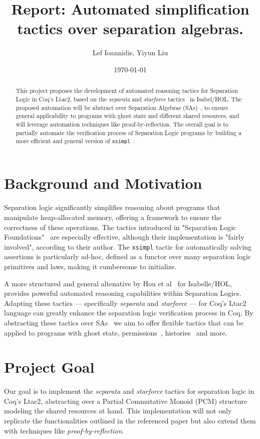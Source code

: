 \documentclass[12pt,lettersize]{article}
\title{Report: Automated simplification tactics over separation algebras.}
\author{Lef Ioannidis, Yiyun Liu}
\date{\today}
\begin{document}
\maketitle


\begin{abstract}
This project proposes the development of automated reasoning tactics for Separation Logic in Coq's Ltac2, based on the \emph{separata}
and \emph{starforce} tactics~\cite{hou2017proof} in Isabel/HOL. The proposed automation will be
abstract over Separation Algebras (SAs)~\cite{calcagno2007local}, to ensure general applicability to programs with 
ghost state and different shared resources, and will leverage automation techniques like proof-by-reflection.
The overall goal is to partially automate the verification process of Separation Logic programs by building
a more efficient and general version of \texttt{xsimpl}~\cite{chargueraud2020separation}.
\end{abstract}

\section{Background and Motivation}
Separation logic significantly simplifies reasoning about programs that manipulate heap-allocated memory, offering a framework
to ensure the correctness of these operations. The tactics introduced in "Separation Logic Foundations"~\cite{chargueraud2020separation}
are especially effective, although their implementation is "fairly involved", according to their author. The \texttt{xsimpl} tactic
for automatically solving assertions is particularly ad-hoc, defined as a functor over many separation logic primitives and laws,
making it cumbersome to initialize.

A more structured and general altenative by Hou et al~\cite{hou2017proof} for Isabelle/HOL, provides powerful automated reasoning
capabilities within Separation Logics. Adapting these tactics --- specifically \emph{separata} and 
\emph{starforce} --- for Coq's Ltac2 language can greatly enhance the separation logic verification process in Coq.
By abstracting these tactics over SAs~\cite{calcagno2007local} we aim to offer
flexible tactics that can be applied to programs with ghost state, permissions~\cite{bornat2005permission}, 
histories~\cite{sergey2015specifying} and more.

\section{Project Goal}
Our goal is to implement the \emph{separata} and \emph{starforce} tactics for separation logic in Coq's Ltac2, abstracting over
a Partial Commutative Monoid (PCM) structure modeling the shared resources at hand. This implementation will not only replicate
the functionalities outlined in the referenced paper but also extend them with techniques
like \emph{proof-by-reflection}.
\end{document}
